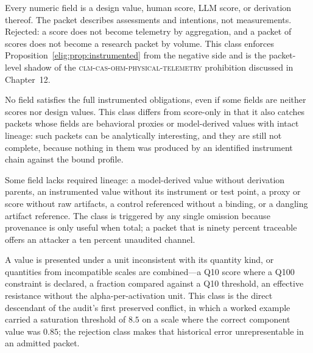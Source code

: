 \begin{checkclass}\label{elig:cc:scoreonly}
Every numeric field is a design value, human score, LLM score, or derivation thereof. The packet describes assessments and intentions, not measurements. Rejected: a score does not become telemetry by aggregation, and a packet of scores does not become a research packet by volume. This class enforces Proposition~\ref{elig:prop:instrumented} from the negative side and is the packet-level shadow of the \textsc{clm-cas-ohm-physical-telemetry} prohibition discussed in Chapter~12.
\end{checkclass}

\begin{checkclass}\label{elig:cc:zeroinstr}
No field satisfies the full instrumented obligations, even if some fields are neither scores nor design values. This class differs from score-only in that it also catches packets whose fields are behavioral proxies or model-derived values with intact lineage: such packets can be analytically interesting, and they are still not complete, because nothing in them was produced by an identified instrument chain against the bound profile.
\end{checkclass}

\begin{checkclass}\label{elig:cc:missingprov}
Some field lacks required lineage: a model-derived value without derivation parents, an instrumented value without its instrument or test point, a proxy or score without raw artifacts, a control referenced without a binding, or a dangling artifact reference. The class is triggered by any single omission because provenance is only useful when total; a packet that is ninety percent traceable offers an attacker a ten percent unaudited channel.
\end{checkclass}

\begin{checkclass}\label{elig:cc:mixedscale}
A value is presented under a unit inconsistent with its quantity kind, or quantities from incompatible scales are combined---a Q10 score where a Q100 constraint is declared, a fraction compared against a Q10 threshold, an effective resistance without the alpha-per-activation unit. This class is the direct descendant of the audit's first preserved conflict, in which a worked example carried a saturation threshold of $8.5$ on a scale where the correct component value was $0.85$; the rejection class makes that historical error unrepresentable in an admitted packet.
\end{checkclass}

